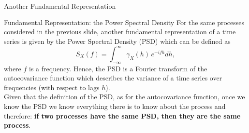 \documentclass[envcountsect,usenames,dvipsnames]{beamer}
\theoremstyle{mystyle}
\begin{document}
\begin{frame}{Another Fundamental Representation}
    
\begin{alertblock}{Fundamental Representation: the Power Spectral Density}
For the same processes considered in the previous slide, another fundamental representation of a time series is given by the Power Spectral Density (PSD) which can be defined as
%
\begin{equation*}
    S_X(f) = \int_{- \infty}^{\infty} \gamma_{X}(h)\,e^{-ifh}dh,
\end{equation*}
%
where $f$ is a frequency. Hence, the PSD is a Fourier transform of the autocovariance function which describes the variance of a time series over frequencies (with respect to lags $h$).\\[0.2cm]

Given that the definition of the PSD, as for the autocovariance function, once we know the PSD we know everything there is to know about the process and therefore: \textbf{if two processes have the same PSD, then they are the same process}.
\end{alertblock}

\end{frame}





\end{document}
